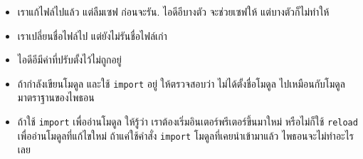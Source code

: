 \begin{itemize}


\item เราแก้ไฟล์ไปแล้ว แต่ลืมเซฟ ก่อนจะรัน.
ไอดีอีบางตัว จะช่วยเซฟให้ แต่บางตัวก็ไม่ทำให้


\item เราเปลี่ยนชื่อไฟล์ไป แต่ยังไม่รันชื่อไฟล์เก่า


\item ไอดีอีมีค่าที่ปรับตั้งไว้ไม่ถูกอยู่


\item ถ้ากำลังเขียนโมดูล และใช้ \texttt{import} อยู่ ให้ตรวจสอบว่า ไม่ได้ตั้งชื่อโมดูล ไปเหมือนกับโมดูลมาตราฐานของไพธอน


\item ถ้าใช้ \texttt{import} เพื่ออ่านโมดูล
ให้รู้ว่า เราต้องเริ่มอินเตอร์พรีเตอร์ขึ้นมาใหม่ หรือไม่ก็ใช้ \texttt{reload} เพื่ออ่านโมดูลที่แก้ไขใหม่
ถ้าแค่ใช้คำสั่ง \texttt{import} โมดูลที่เคยนำเข้ามาแล้ว ไพธอนจะไม่ทำอะไรเลย

\end{itemize}


